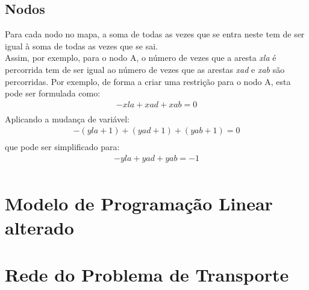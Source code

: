 \documentclass[a4paper]{report}
\begin{document}
\subsection{Nodos}
Para cada nodo no mapa, a soma de todas as vezes que se entra neste
tem de ser igual à soma de todas as vezes que se sai.\\
Assim, por exemplo, para o nodo A, o número de vezes que a aresta
\textit{xla} é percorrida tem de ser igual ao número de vezes que
as arestas \textit{xad} e \textit{xab} são percorridas.
Por exemplo, de forma a criar uma restrição para o nodo A, esta pode ser
formulada como:\\
\begin{multline}
- xla + xad + xab = 0 \\
\end{multline}
Aplicando a mudança de variável:
\begin{multline}
- (yla + 1) + (yad +1) + (yab +1) = 0 \\
\end{multline}
que pode ser simplificado para:
\begin{multline}
- yla + yad + yab = -1\\
\end{multline}

\pagebreak
\section{Modelo de Programação Linear alterado}


\pagebreak
\section{Rede do Problema de Transporte}
\begin{figure}[H]
\centering
{}
\end{figure}
\end{document}
